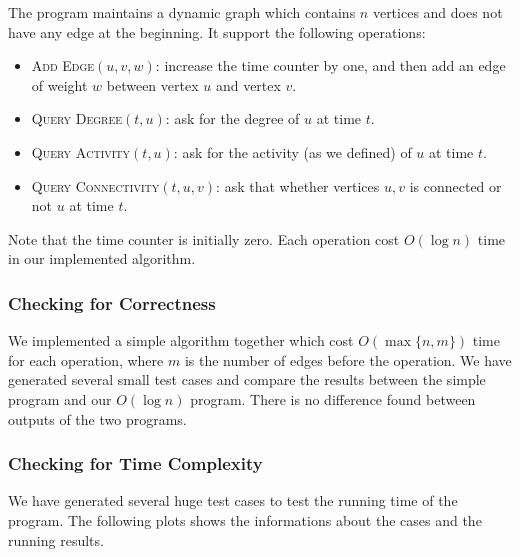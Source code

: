 \documentclass[12pt,abstract=true]{scrartcl}
\numberwithin{equation}{section}
\theoremstyle{definition}   \newtheorem{definition}{Definition}[section]
\theoremstyle{plain}        \newtheorem{theorem}{Theorem}[section]
\theoremstyle{plain}        \newtheorem{observation}{Observation}[section]
\theoremstyle{plain}        \newtheorem{fact}{Fact}[section]
\theoremstyle{plain}        \newtheorem{claim}{Claim}[section]
\theoremstyle{plain}        \newtheorem{lemma}[theorem]{Lemma}
\theoremstyle{plain}        \newtheorem{corollary}[theorem]{Corollary}
\theoremstyle{remark}       \newtheorem{example}{Example}[section]
\theoremstyle{remark}       \newtheorem{remark}{Remark}[section]
\begin{document}
The program maintains a dynamic graph which contains $n$ vertices and does not
have any edge at the beginning.
It support the following operations:
\begin{itemize}
	\item \textsc{Add Edge$(u,v,w)$:} increase the time counter by one, and then add an edge
		of weight $w$ between vertex $u$ and vertex $v$.
	\item \textsc{Query Degree$(t,u)$:} ask for the degree of $u$ at time $t$.
	\item \textsc{Query Activity$(t,u)$:} ask for the activity (as we defined) of $u$ at time $t$.
	\item \textsc{Query Connectivity$(t,u,v)$:} ask that whether vertices $u,v$ is connected or not
		$u$ at time $t$.
\end{itemize}
Note that the time counter is initially zero.
Each operation cost $O(\log n)$ time in our implemented algorithm.

\subsubsection{Checking for Correctness}
We implemented a simple algorithm together which cost $O(\max\{n,m\})$ time for
each operation, where $m$ is the number of edges before the operation.  We have
generated several small test cases and compare the results between the simple
program and our $O(\log n)$ program.  There is no difference found between
outputs of the two programs.

\subsubsection{Checking for Time Complexity}
We have generated several huge test cases to test the running time of the program.
The following plots shows the informations about the cases and the running results.
\end{document}
